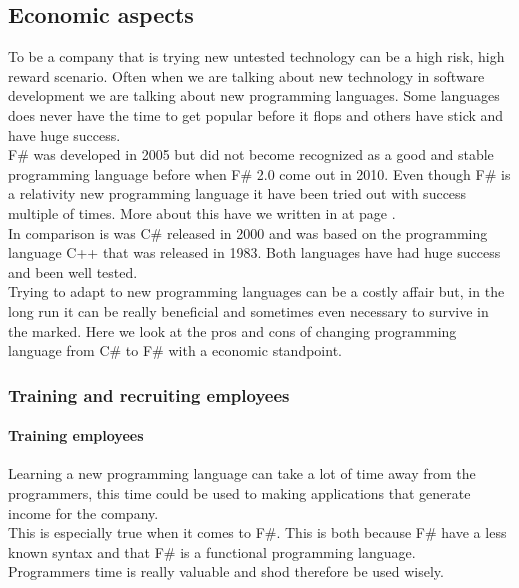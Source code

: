 \documentclass[12pt, a4paper]{article}
\begin{document}
\newpage
\subsection{Economic aspects}

To be a company that is trying new untested technology can be a high risk, high reward scenario. Often when we are talking about new technology in software development we are talking about new programming languages. Some languages does never have the time to get popular before it flops and others have stick and have huge success.\\

F\# was developed in 2005 but did not become recognized as a good and stable programming language before when F\# 2.0 come out in 2010. Even though F\# is a relativity new programming language it have been tried out with success multiple of times. More about this have we written in  at page \pageref{Testimonials}.\\

In comparison is was C\# released in 2000 and was based on the programming language C++ that was released in 1983. Both languages have had huge success and been well tested.\\

Trying to adapt to new programming languages can be a costly affair but, in the long run it can be really beneficial and sometimes even necessary to survive in the marked. Here we look at the pros and cons of changing programming language from C\# to F\# with a economic standpoint.

\newpage
\subsubsection{Training and recruiting employees}

\paragraph{Training employees}
Learning a new programming language can take a lot of time away from the programmers, this time could be used to making applications that generate income for the company.\\

This is especially true when it comes to F\#. This is both because F\# have a less known syntax and that F\# is a functional programming language.\\

Programmers time is really valuable and shod therefore be used wisely. 
\end{document}
